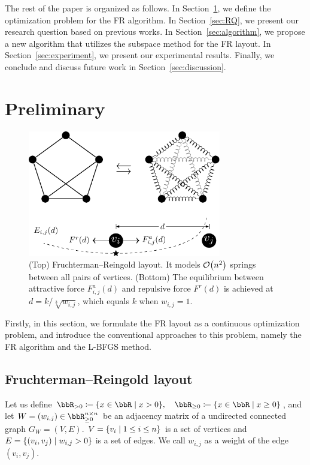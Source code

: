 \documentclass[dvipdfmx,journal]{IEEEtran}
\newcommand{\defeq}{\coloneqq}
\begin{document}
The rest of the paper is organized as follows.
In Section~\ref{sec:preliminary}, we define the optimization problem for the FR algorithm.
In Section~\ref{sec:RQ}, we present our research question based on previous works.
In Section~\ref{sec:algorithm}, we propose a new algorithm that utilizes the subspace method for the FR layout.
In Section~\ref{sec:experiment}, we present our experimental results.
Finally, we conclude and discuss future work in Section~\ref{sec:discussion}.

\section{Preliminary}\label{sec:preliminary}

\begin{figure}[t]
  \centering
  \includegraphics[height=5.5cm]{fr_layout.pdf}
  \caption{
    (Top) Fruchterman--Reingold layout. It models $\order{n^2}$ springs between all pairs of vertices.
    (Bottom) The equilibrium between attractive force $F_{i,j}^a(d)$ and repulsive force $F^r(d)$ is achieved at $d = k/\sqrt[3]{w_{i,j}}$, which equals $k$ when $w_{i,j} = 1$.
  }
  \label{fig:frLayout}
\end{figure}

Firstly, in this section, we formulate the FR layout as a continuous optimization problem, and introduce the conventional approaches to this problem, namely the FR algorithm and the L-BFGS method.

\subsection{Fruchterman--Reingold layout}\label{ssec:frLayout}

Let us define
$\bbR_{> 0} \defeq \qty{ x \in \bbR \mid x > 0 }, \quad \bbR_{\geq 0} \defeq \qty{ x \in \bbR \mid x \geq 0 }$,
and let $W = (w_{i,j}) \in \bbR_{\geq 0}^{n \times n}$ be an adjacency matrix of a undirected connected graph $G_W = (V, E)$. $V = \qty{v_i \mid 1 \leq i \leq n}$ is a set of vertices and $E = \qty{(v_i, v_j) \mid w_{i,j} > 0}$ is a set of edges. We call $w_{i,j}$ as a weight of the edge $(v_i, v_j)$.
\end{document}
